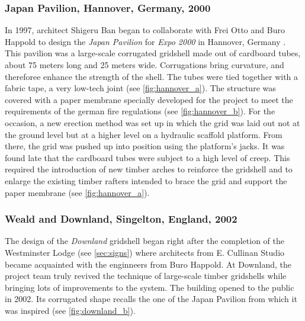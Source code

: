 \subsubsection{Japan Pavilion, Hannover, Germany, 2000}
In 1997, architect Shigeru Ban began to collaborate with Frei Otto and Buro Happold to design the \emph{Japan Pavilion} for \emph{Expo 2000} in Hannover, Germany \cite{Ban2006}. This pavilion was a large-scale corrugated gridshell made out of cardboard tubes, about 75 meters long and 25 meters wide. Corrugations bring curvature, and thereforee enhance the strength of the shell. The tubes were tied together with a fabric tape, a very low-tech joint (see \cref{fig:hannover_a}). The structure was covered with a paper membrane specially developed for the project to meet the requirements of the german fire regulations (see \cref{fig:hannover_b}). For the occasion, a new erection method was set up in which the grid was laid out not at the ground level but at a higher level on a hydraulic scaffold platform. From there, the grid was pushed up into position using the platform's jacks. It was found late that the cardboard tubes were subject to a high level of creep. This required the introduction of new timber arches to reinforce the gridshell and to enlarge the existing timber rafters intended to brace the grid and support the paper membrane (see \cref{fig:hannover_a}).

\subsubsection{Weald and Downland, Singelton, England, 2002}
The design of the \emph{Downland} gridshell began right after the completion of the Westminster Lodge (see \cref{sec:signs}) where architects from E. Cullinan Studio became acquainted with the enginneers from Buro Happold. At Downland, the project team truly revived the technique of large-scale timber gridshells while bringing lots of improvements to the system. The building opened to the public in 2002. Its corrugated shape recalls the one of the Japan Pavilion from which it was inspired (see \cref{fig:downland_b}).

